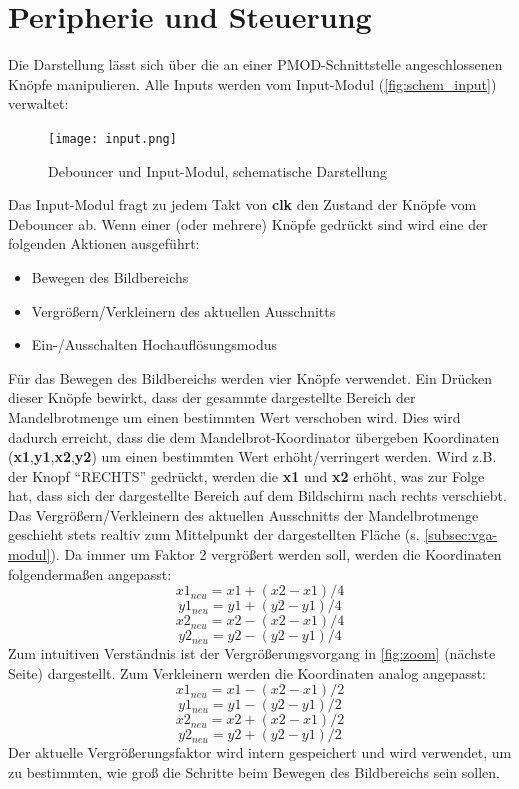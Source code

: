 \documentclass[a4paper,12pt,onesided]{report}
\begin{document}
\section{Peripherie und Steuerung}
\label{sec:peripheriesteuerung}
Die Darstellung lässt sich über die an einer PMOD-Schnittstelle angeschlossenen Knöpfe manipulieren.
Alle Inputs werden vom Input-Modul (\autoref{fig:schem_input}) verwaltet:
\begin{figure}[H]
	\centering
	\texttt{[image: input.png]}
	\caption{Debouncer und Input-Modul, schematische Darstellung}
	\label{fig:schem_input}
\end{figure}
Das Input-Modul fragt zu jedem Takt von \textbf{clk} den Zustand der Knöpfe vom Debouncer ab.
Wenn einer (oder mehrere) Knöpfe gedrückt sind wird eine der folgenden Aktionen ausgeführt:
\begin{itemize}
	\item Bewegen des Bildbereichs
	\item Vergrößern/Verkleinern des aktuellen Ausschnitts
	\item Ein-/Ausschalten Hochauflösungsmodus
\end{itemize}
Für das Bewegen des Bildbereichs werden vier Knöpfe verwendet.
Ein Drücken dieser Knöpfe bewirkt, dass der gesammte dargestellte Bereich der Mandelbrotmenge um einen bestimmten Wert verschoben wird.
Dies wird dadurch erreicht, dass die dem Mandelbrot-Koordinator übergeben Koordinaten (\textbf{x1},\textbf{y1},\textbf{x2},\textbf{y2}) um einen bestimmten Wert erhöht/verringert werden.
Wird z.B. der Knopf "`RECHTS"' gedrückt, werden die \textbf{x1} und \textbf{x2} erhöht, was zur Folge hat, dass sich der dargestellte Bereich auf dem Bildschirm nach rechts verschiebt.\\
Das Vergrößern/Verkleinern des aktuellen Ausschnitts der Mandelbrotmenge geschieht stets realtiv zum Mittelpunkt der dargestellten Fläche (s. \autoref{subsec:vga-modul}).
Da immer um Faktor 2 vergrößert werden soll, werden die Koordinaten folgendermaßen angepasst:
\[x1_{neu} = x1 + (x2-x1)/4\]
\[y1_{neu} = y1 + (y2-y1)/4\]
\[x2_{neu} = x2 - (x2-x1)/4\]
\[y2_{neu} = y2 - (y2-y1)/4\]
Zum intuitiven Verständnis ist der Vergrößerungsvorgang in \autoref{fig:zoom} (nächste Seite) %
dargestellt.
Zum Verkleinern werden die Koordinaten analog angepasst:
\[x1_{neu} = x1 - (x2-x1)/2\]
\[y1_{neu} = y1 - (y2-y1)/2\]
\[x2_{neu} = x2 + (x2-x1)/2\]
\[y2_{neu} = y2 + (y2-y1)/2\]
Der aktuelle Vergrößerungsfaktor wird intern gespeichert und wird verwendet, um zu bestimmten, wie groß die Schritte beim Bewegen des Bildbereichs sein sollen.
\end{document}
